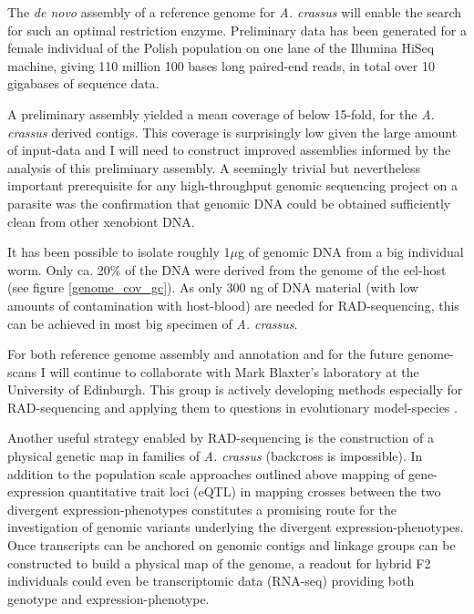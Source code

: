 The \textit{de novo} assembly of a reference genome for
\textit{A. crassus} will enable the search for such an optimal
restriction enzyme. Preliminary data has been generated for a female
individual of the Polish population on one lane of the Illumina HiSeq
machine, giving 110 million 100 bases long paired-end reads, in total
over 10 gigabases of sequence data.

A preliminary assembly yielded a mean coverage of below 15-fold, for
the \textit{A. crassus} derived contigs. This coverage is surprisingly
low given the large amount of input-data and I will need to construct
improved assemblies informed by the analysis of this preliminary
assembly. A seemingly trivial but nevertheless important prerequisite
for any high-throughput genomic sequencing project on a parasite was
the confirmation that genomic DNA could be obtained sufficiently clean
from other xenobiont DNA.


It has been possible to isolate roughly 1$\mu$g of genomic DNA from a
big individual worm. Only ca. 20\% of the DNA were derived from the
genome of the eel-host (see figure \ref{genome_cov_gc}). As only 300
ng of DNA material (with low amounts of contamination with host-blood)
are needed for RAD-sequencing, this can be achieved in most big
specimen of \textit{A. crassus}.

For both reference genome assembly and annotation and for the future
genome-scans I will continue to collaborate with Mark Blaxter's
laboratory at the University of Edinburgh. This group is actively
developing methods especially for RAD-sequencing and applying them to
questions in evolutionary model-species \cite{pmid21681211}.

Another useful strategy enabled by RAD-sequencing is the construction
of a physical genetic map in families of \textit{A. crassus}
(backcross is impossible). In addition to the population scale
approaches outlined above mapping of gene-expression quantitative
trait loci (eQTL) in mapping crosses between the two divergent
expression-phenotypes constitutes a promising route for the
investigation of genomic variants underlying the divergent
expression-phenotypes. Once transcripts can be anchored on genomic
contigs and linkage groups can be constructed to build a physical map
of the genome, a readout for hybrid F2 individuals could even be
transcriptomic data (RNA-seq) providing both genotype and
expression-phenotype.

